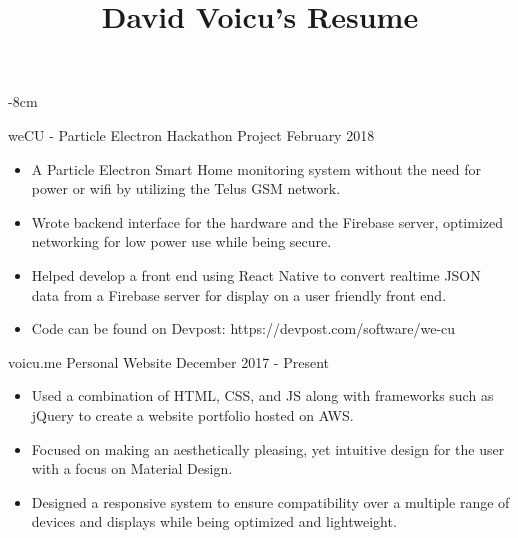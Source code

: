 \documentclass[10pt,a4paper]{altacv}
\begin{document}
\title{David Voicu's Resume}

\begin{adjustwidth}{}{-8cm}
\makecvheader
\end{adjustwidth}


\cvproject
	{weCU - Particle Electron}
    {Hackathon Project}
    {February 2018}
\begin{itemize}
	\item {A Particle Electron Smart Home monitoring system without the need for power or wifi by utilizing the Telus GSM network.}
	\item {Wrote backend interface for the hardware and the Firebase server, optimized networking for low power use while being secure.}
	\item {Helped develop a front end using React Native to convert realtime JSON data from a Firebase server for display on a user friendly front end.}
	\item {Code can be found on Devpost: https://devpost.com/software/we-cu}
\end{itemize}

\divider

\cvproject
	{voicu.me}
    {Personal Website}
    {December 2017 - Present}
\begin{itemize}
	\item {Used a combination of HTML, CSS, and JS along with frameworks such as jQuery to create a website portfolio hosted on AWS.}
    \item {Focused on making an aesthetically pleasing, yet intuitive design for the user with a focus on Material Design.}
    \item {Designed a responsive system to ensure compatibility over a multiple range of devices and displays while being optimized and lightweight.}
\end{itemize}
\end{document}
